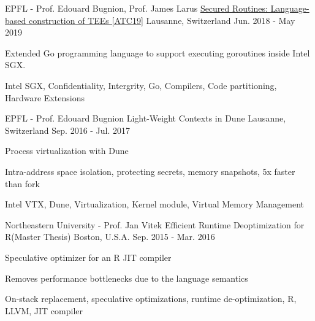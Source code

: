 \begin{cventries}
\cventry
{EPFL - Prof. Edouard Bugnion, Prof. James Larus}
  {\href{https://www.usenix.org/system/files/atc19-ghosn_0.pdf}{Secured Routines: Language-based construction of TEEs [ATC19]}}
{Lausanne, Switzerland}
{Jun. 2018  - May 2019}
{
	\begin{cvitems}
  \item{Extended Go programming language to  support executing goroutines inside Intel SGX.}
	\item{Intel SGX, Confidentiality, Intergrity, Go, Compilers, Code partitioning, Hardware Extensions}
	\end{cvitems}
}

\cventry
{EPFL - Prof. Edouard Bugnion}
{Light-Weight Contexts in Dune}
{Lausanne, Switzerland}
{Sep. 2016 - Jul. 2017}
{
	\begin{cvitems}
  \item{Process virtualization with Dune}
  \item{Intra-address space isolation, protecting secrets, memory snapshots, 5x faster than fork}
	\item{Intel VTX, Dune, Virtualization, Kernel module, Virtual Memory Management}
	\end{cvitems}
}

\cventry
{Northeastern University - Prof. Jan Vitek} %
{Efficient Runtime Deoptimization for R(Master Thesis)} %
{Boston, U.S.A.} %
{Sep. 2015 - Mar. 2016} %
{ %
\begin{cvitems}
\item{Speculative optimizer for an R JIT compiler}
\item{Removes performance bottlenecks due to the language semantics}
\item {On-stack replacement, speculative optimizations, runtime de-optimization, R, LLVM, JIT compiler}
\end{cvitems}
}



\end{cventries}
